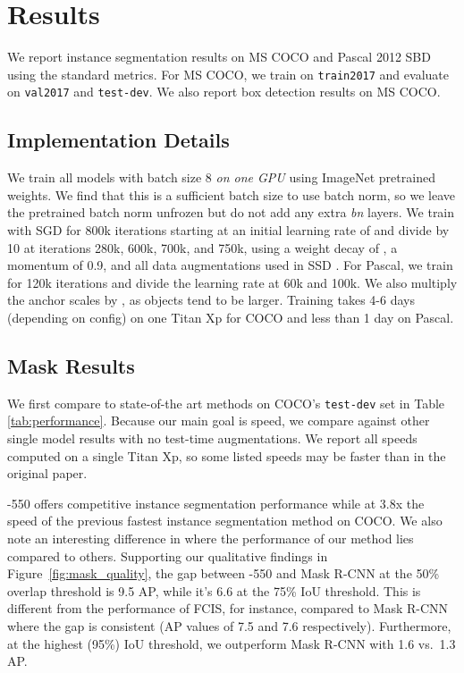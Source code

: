 \documentclass[10pt,journal,compsoc]{IEEEtran}
\begin{document}
\section{Results} \label{sec:results}


We report instance segmentation results on MS COCO \cite{coco} and Pascal 2012 SBD~\cite{sbd} using the standard metrics. For MS COCO, we train on {\tt train2017} and evaluate on {\tt val2017} and {\tt test-dev}.  We also report box detection results on MS COCO.

\subsection{Implementation Details}
We train all models with batch size 8 \textit{on one GPU} using ImageNet \cite{imagenet} pretrained weights. We find that this is a sufficient batch size to use batch norm, so we leave the pretrained batch norm unfrozen but do not add any extra \textit{bn} layers. We train with SGD for 800k iterations starting at an initial learning rate of  and divide by 10 at iterations 280k, 600k, 700k, and 750k, using a weight decay of , a momentum of 0.9, and all data augmentations used in SSD \cite{ssd}. For Pascal, we train for 120k iterations and divide the learning rate at 60k and 100k. We also multiply the anchor scales by , as objects tend to be larger. Training takes 4-6 days (depending on config) on one Titan Xp for COCO and less than 1 day on Pascal.

\subsection{Mask Results}
We first compare \methodname{} to state-of-the art methods on COCO's {\tt test-dev} set in Table \ref{tab:performance}. Because our main goal is speed, we compare against other single model results with no test-time augmentations. We report all speeds computed on a single Titan Xp, so some listed speeds may be faster than in the original paper.
    
\methodname{}-550 offers competitive instance segmentation performance while at 3.8x the speed of the previous fastest instance segmentation method on COCO. We also note an interesting difference in where the performance of our method lies compared to others. Supporting our qualitative findings in Figure~\ref{fig:mask_quality}, the gap between \methodname{}-550 and Mask R-CNN at the 50\% overlap threshold is 9.5 AP, while it's 6.6 at the 75\% IoU threshold. This is different from the performance of FCIS, for instance, compared to Mask R-CNN where the gap is consistent (AP values of 7.5 and 7.6 respectively). Furthermore, at the highest (95\%) IoU threshold, we outperform Mask R-CNN with 1.6 vs.~1.3 AP.
\end{document}
